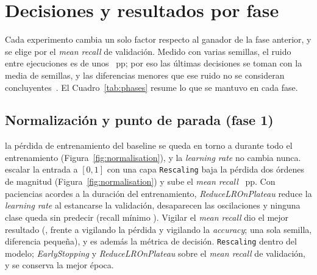 \section{Decisiones y resultados por fase}
Cada experimento cambia un solo factor respecto al ganador de la fase anterior, y se elige por el \emph{mean recall}
de validación. Medido con varias semillas, el ruido entre ejecuciones es de unos ~pp; por eso las
últimas decisiones se toman con la media de  semillas, y las diferencias menores que ese ruido no se
consideran concluyentes~\cite{bouthillier}. El Cuadro~\ref{tab:phases} resume lo que se mantuvo en cada fase.

\begin{table}[h]
  \centering\small
  \caption{Configuración que se mantiene al final de cada fase (validación; media $\pm$ desviación típica cuando hay
  varias semillas).}
  \label{tab:phases}
\end{table}

\subsection{Normalización y punto de parada (fase 1)}
{la pérdida de entrenamiento del baseline se queda en torno a  durante todo el entrenamiento
(Figura~\ref{fig:normalisation}), y la \emph{learning rate} no cambia nunca.}
{escalar la entrada a $[0, 1]$ con una capa \texttt{Rescaling} baja la pérdida dos órdenes de magnitud
(Figura~\ref{fig:normalisation}) y sube el \emph{mean recall} ~pp.
Con paciencias acordes a la duración del entrenamiento, \emph{ReduceLROnPlateau} reduce la \emph{learning rate} al
estancarse la validación, desaparecen las oscilaciones y ninguna clase queda sin predecir (recall mínimo
). Vigilar el \emph{mean recall} dio el mejor resultado (, frente a
 vigilando la pérdida y  vigilando la \emph{accuracy};
una sola semilla, diferencia pequeña), y es además la métrica de decisión.}
{\texttt{Rescaling} dentro del modelo; \emph{EarlyStopping} y \emph{ReduceLROnPlateau} sobre el \emph{mean recall}
de validación, y se conserva la mejor época.}

